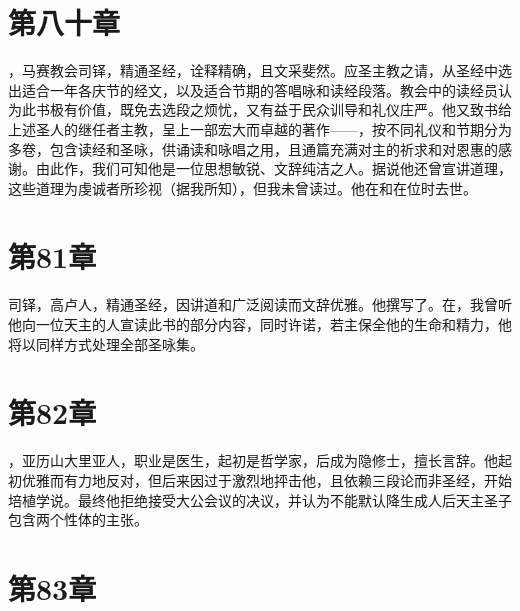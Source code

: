 
\section{第八十章}

，马赛教会司铎，精通圣经，诠释精确，且文采斐然。应圣主教之请，从圣经中选出适合一年各庆节的经文，以及适合节期的答唱咏和读经段落。教会中的读经员认为此书极有价值，既免去选段之烦忧，又有益于民众训导和礼仪庄严。他又致书给上述圣人的继任者主教，呈上一部宏大而卓越的著作——，按不同礼仪和节期分为多卷，包含读经和圣咏，供诵读和咏唱之用，且通篇充满对主的祈求和对恩惠的感谢。由此作，我们可知他是一位思想敏锐、文辞纯洁之人。据说他还曾宣讲道理，这些道理为虔诚者所珍视（据我所知），但我未曾读过。他在和在位时去世。\par


\section{第81章}

司铎，高卢人，精通圣经，因讲道和广泛阅读而文辞优雅。他撰写了。在，我曾听他向一位天主的人宣读此书的部分内容，同时许诺，若主保全他的生命和精力，他将以同样方式处理全部圣咏集。\par


\section{第82章}

，亚历山大里亚人，职业是医生，起初是哲学家，后成为隐修士，擅长言辞。他起初优雅而有力地反对，但后来因过于激烈地抨击他，且依赖三段论而非圣经，开始培植学说。最终他拒绝接受大公会议的决议，并认为不能默认降生成人后天主圣子包含两个性体的主张。\par


\section{第83章}


